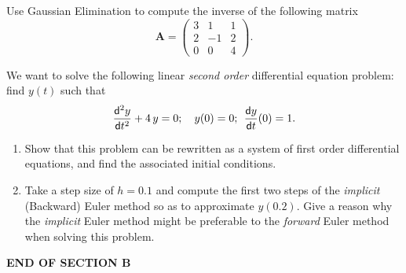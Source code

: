 \documentclass[12pt]{article}
\def\bA{\mathbf{A}}
\newcommand{\dif}{\mathsf{d}}
\newcommand{\EndSec}[1]{\begin{center}\bf END OF SECTION #1\end{center}}
\begin{document}
\question
Use Gaussian Elimination to compute  the inverse of  the following matrix
$$ \bA = \left( \begin{array}{rrr} 3 & 1  &1\\ 2 & -1 & 2\\0 & 0 & 4 \end{array} \right). $$
\null\vspace{-0.6cm}
 
 

\bigskip
\question
We want to solve the following  linear  {\it  second order} differential equation
problem: find  $y(t)$ such that
$$
{\dif^2 y\over \dif t^2} + 4\,y =0 ; \quad y(0)=0; \>\> {\dif y\over \dif t} (0)=1.
$$

\begin{enumerate}
\item
Show that this problem can be rewritten  as a system of
first order differential equations, and find the associated initial conditions.
\null\vspace{-0.2cm} 

\item
 Take a  step size  of $h=0.1$  and
compute the first two steps of the  {\it implicit} (Backward) Euler  method
 so as to approximate $y(0.2)$.  Give a reason why the {\it implicit} Euler
 method might be preferable
 to the  {\it forward} Euler method when solving this problem.
 \null\vspace{-0.2cm} 

\end{enumerate}

\EndSec{B}
\finished
\end{document}
